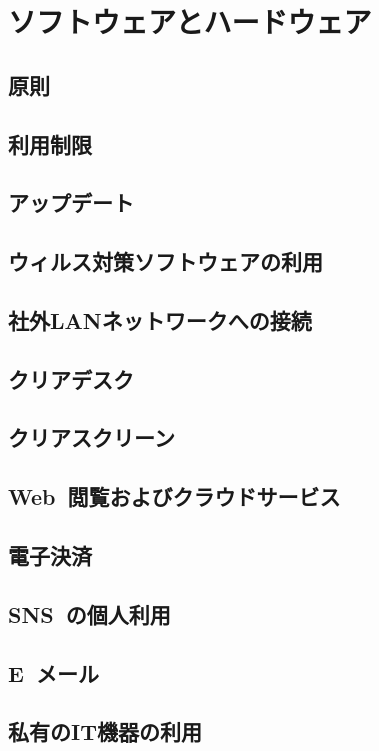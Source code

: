 \chapter{ソフトウェアとハードウェア}
\section{原則}
\section{利用制限}
\section{アップデート}
\section{ウィルス対策ソフトウェアの利用}
\section{社外LANネットワークへの接続}
\section{クリアデスク}
\section{クリアスクリーン}
\section{Web~閲覧およびクラウドサービス}
\section{電子決済}
\section{SNS~の個人利用}
\section{E~メール}
\section{私有のIT機器の利用}
